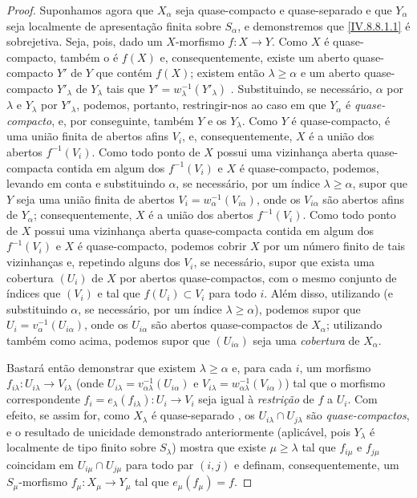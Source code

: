 \begin{proof}
Suponhamos agora que $X_\alpha$ seja quase-compacto e quase-separado e que $Y_\alpha$ seja localmente de apresentação finita sobre $S_\alpha$, e demonstremos que \eqref{IV.8.8.1.1} é sobrejetiva.
Seja, pois, dado um $X$-morfismo $f:X\to Y$.
Como $X$ é quase-compacto, também o é
$f(X)$ e, consequentemente, existe um aberto quase-compacto $Y'$ de $Y$ que contém $f(X)$; existem então $\lambda\geqslant\alpha$ e um aberto quase-compacto $Y'_\lambda$ de $Y_\lambda$ tais que $Y'=w_\lambda^{-1}(Y'_\lambda)$ .
Substituindo, se necessário, $\alpha$ por $\lambda$ e $Y_\lambda$ por $Y'_\lambda$, podemos, portanto, restringir-nos ao caso em que $Y_\alpha$ é \emph{quase-compacto}, e, por conseguinte, também $Y$ e os $Y_\lambda$.
Como $Y$ é quase-compacto, é uma união finita de abertos afins $V_i$, e, consequentemente, $X$ é a união dos abertos $f^{-1}(V_i)$. Como todo ponto de $X$ possui uma vizinhança aberta quase-compacta contida em algum dos $f^{-1}(V_i)$ e $X$ é quase-compacto, podemos, levando em conta  e substituindo $\alpha$, se necessário, por um índice $\lambda\geqslant\alpha$, supor que $Y$ seja uma união finita de abertos $V_i=w_\alpha^{-1}(V_{i\alpha})$, onde os $V_{i\alpha}$ são abertos afins de $Y_\alpha$; consequentemente, $X$ é a união dos abertos $f^{-1}(V_i)$. Como todo ponto de $X$ possui uma vizinhança aberta quase-compacta contida em algum dos $f^{-1}(V_i)$ e $X$ é quase-compacto, podemos cobrir $X$ por um número finito de tais vizinhanças e, repetindo alguns dos $V_i$, se necessário, supor que exista uma cobertura $(U_i)$ de $X$ por abertos quase-compactos, com o mesmo conjunto de índices que $(V_i)$ e tal que $f(U_i)\subset V_i$ para todo $i$. Além disso, utilizando  (e substituindo $\alpha$, se necessário, por um índice $\lambda\geqslant\alpha$), podemos supor que $U_i=v_\alpha^{-1}(U_{i\alpha})$, onde os $U_{i\alpha}$ são abertos quase-compactos de $X_\alpha$; utilizando também  como acima, podemos supor que $(U_{i\alpha})$ seja uma \emph{cobertura} de $X_\alpha$.

Bastará então demonstrar que existem $\lambda\geqslant\alpha$ e, para cada $i$, um morfismo $f_{i\lambda}:U_{i\lambda}\to V_{i\lambda}$ (onde $U_{i\lambda}=v_{\alpha\lambda}^{-1}(U_{i\alpha})$ e $V_{i\lambda}=w_{\alpha\lambda}^{-1}(V_{i\alpha})$) tal que o morfismo correspondente $f_i=e_\lambda(f_{i\lambda}):U_i\to V_i$ seja igual à \emph{restrição} de $f$ a $U_i$.
Com efeito, se assim for, como $X_\lambda$ é quase-separado , os $U_{i\lambda}\cap U_{j\lambda}$ são \emph{quase-compactos}, e o resultado de unicidade demonstrado anteriormente (aplicável, pois $Y_\lambda$ é localmente de tipo finito sobre $S_\lambda$) mostra que existe $\mu\geqslant\lambda$ tal que $f_{i\mu}$ e $f_{j\mu}$ coincidam em $U_{i\mu}\cap U_{j\mu}$ para todo par $(i,j)$ e definam, consequentemente, um $S_\mu$-morfismo $f_\mu:X_\mu\to Y_\mu$ tal que $e_\mu(f_\mu)=f$.


\end{proof}
